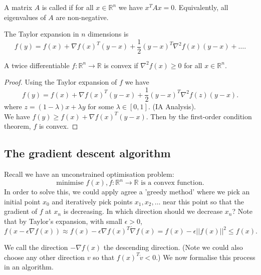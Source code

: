 \documentclass[a4paper]{scrartcl}
\begin{document}
\begin{definition}
	 A matrix $A$ is called  if for all $ x \in \mathbb{R}^{n} $ we have $x^T Ax=0$. Equivalently, all eigenvalues of $A$ are non-negative. 
\end{definition}

\begin{remark}
	The Taylor expansion in $n$ dimensions is 
	\[f(y)=f(x)+\nabla f(x)^T(y-x)+\frac{1}{2} (y-x)^T \nabla^2 f(x)(y-x)+\ldots.\] 
\end{remark}

\begin{theorem}
	 A twice differentiable $f: \mathbb{R}^{n}\rightarrow \mathbb{R}$ is convex if $\nabla^2 f(x) \geq 0$ for all $ x \in \mathbb{R}^{n}$.  
\end{theorem}

\begin{proof}
	 Using the Taylor expansion of $f$ we have 
	 \[f(y)=f(x)+\nabla f(x)^T(y-x) + \frac{1}{2} (y-x)^T \nabla^2 f(z)(y-x).\]
	 where $z=(1-\lambda)x+ \lambda y$ for some $\lambda\in [0,1]$. (IA Analysis).\\
	 We have $f(y) \geq f(x)+\nabla f(x)^T(y-x)$. Then by the first-order condition theorem, $f$ is convex. 
\end{proof}

\subsection{The gradient descent algorithm}
Recall we have an unconstrained optimisation problem: 
\[\text{minimise }  f(x), f:\mathbb{R}^{n} \rightarrow \mathbb{R} \text{ is a convex function} .\] 
In order to solve this, we could apply agree a 'greedy method' where we pick an initial point $x_0$ and iteratively pick points $x_1,x_2,\ldots$ near this point so that the gradient of $f$ at $x_n$ is decreasing. In which direction should we decrease $x_n$? Note that by Taylor's expansion, with small $\epsilon>0$, 
\[f(x-\epsilon \nabla f(x))\approx f(x)-\epsilon \nabla f(x)^T \dot \nabla f(x)=f(x)-\epsilon ||f(x)||^2 \leq f(x).\]

We call the direction $-\nabla f(x)$ the descending direction. (Note we could also choose any other direction $v$ so that $f(x)^T \dot v <0$.) We now formalise this process in an algorithm.
\end{document}
